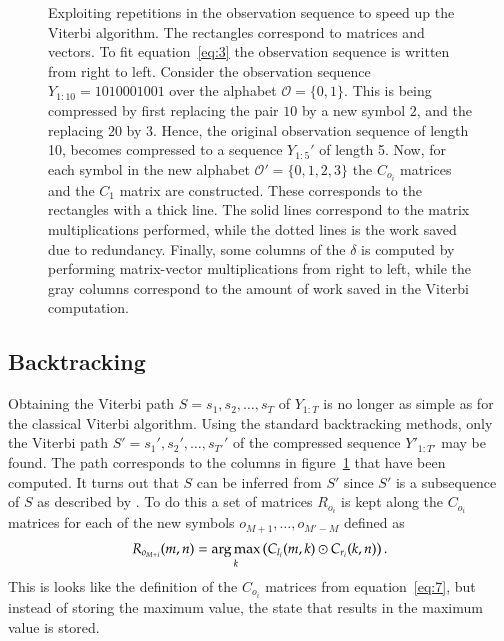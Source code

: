 \begin{figure}
  \centering
  
  \caption{Exploiting repetitions in the observation sequence to speed up the
    Viterbi algorithm. The rectangles correspond to matrices and vectors. To
    fit equation~\eqref{eq:3} the observation sequence is written from right to
    left. Consider the observation sequence $Y_{1:10} = 1010001001$ over the
    alphabet $\mathcal{O} = \{0, 1\}$. This is being compressed by first
    replacing the pair $10$ by a new symbol $2$, and the replacing $20$ by $3$.
    Hence, the original observation sequence of length 10, becomes compressed
    to a sequence $Y_{1:5}'$ of length 5. Now, for each symbol in the new
    alphabet $\mathcal{O'} = \{0, 1, 2, 3\}$ the $C_{o_i}$ matrices and the
    $C_1$ matrix are constructed. These corresponds to the rectangles with a
    thick line. The solid lines correspond to the matrix multiplications
    performed, while the dotted lines is the work saved due to redundancy.
    Finally, some columns of the $\delta$ is computed by performing
    matrix-vector multiplications from right to left, while the gray columns
    correspond to the amount of work saved in the Viterbi computation.}
  \label{fig:exploiting-repetitions}
\end{figure}

\subsection{Backtracking}
\label{sec:backtracking}

Obtaining the Viterbi path $S = s_1, s_2, \dots, s_T$ of $Y_{1:T}$ is no longer
as simple as for the classical Viterbi algorithm. Using the standard
backtracking methods, only the Viterbi path $S' = s_1', s_2', \dots, s_{T'}'$
of the compressed sequence $Y'_{1:T'}$ may be found. The path corresponds to
the columns in figure~\ref{fig:exploiting-repetitions} that have been
computed. It turns out that $S$ can be inferred from $S'$ since $S'$
is a subsequence of $S$ as described by \citet{lifshits2009speeding}. To do
this a set of matrices $R_{o_i}$ is kept along the $C_{o_i}$ matrices for each
of the new symbols $o_{M + 1}, \dots, o_{M' - M}$ defined as
\begin{equation*}
  R_{o_{M + i}}(m, n) = \operatorname*{arg\,max}_k
  \left(
    C_{l_i}(m, k) \odot C_{r_i}(k, n)
  \right).
\end{equation*}
This is looks like the definition of the $C_{o_i}$ matrices from
equation~\eqref{eq:7}, but instead of storing the maximum value, the state that
results in the maximum value is stored.

